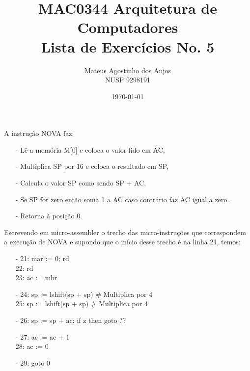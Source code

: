 \documentclass[12pt]{article}
\title{MAC0344 Arquitetura de Computadores\\
Lista de Exercícios No. 5
}
\author{Mateus Agostinho dos Anjos\\NUSP 9298191}
\date{\today}
\begin{document}
	\maketitle
    A instrução NOVA faz:
    \begin{itemize}
        \item[-]
            Lê a memória M[0] e coloca o valor lido em AC,
        \item[-]
            Multiplica SP por 16 e coloca o resultado em SP,
        \item[-]  
            Calcula o valor SP como sendo SP + AC,
        \item[-] 
            Se SP for zero então soma 1 a AC
            caso contrário faz AC igual a zero.
        \item[-]
            Retorna à posição 0.
    \end{itemize}

    Escrevendo em micro-assembler o trecho das micro-instruções que 
    correspondem a execução de NOVA e supondo que o início desse trecho é na 
    linha 21, temos:

    \begin{itemize}
        \item[-]
            21: mar := 0; rd\\
            22: rd\\
            23: ac := mbr\\
        \item[-]
            24: sp := lshift(sp + sp) \# Multiplica por 4\\
            25: sp := lshift(sp + sp) \# Multiplica por 4\\
        \item[-]  
            26: sp := sp + ac; if z then goto ??\\
        \item[-]
            27: ac := ac + 1\\
            28: ac := 0\\
        \item[-]
            29: goto 0\\
    \end{itemize}
\end{document}

